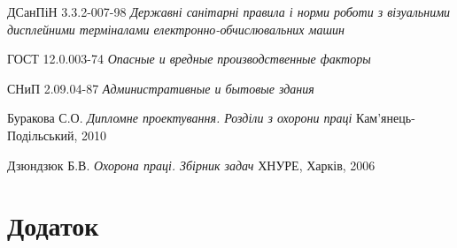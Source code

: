 \documentclass[a4paper,12pt]{article}
\begin{document}
\begin{thebibliography}{9}
	ДСанПіН  3.3.2-007-98
	\emph{Державні санітарні правила і норми роботи з візуальними дисплейними терміналами електронно-обчислювальних машин}
	
	ГОСТ 12.0.003-74
	\emph{Опасные и вредные производственные факторы}
	
	СНиП 2.09.04-87
	\emph{Административные и бытовые здания}
	
	Буракова С.О.
	\emph{Дипломне проектування. Розділи з охорони праці}
	Кам’янець-Подільський, 2010
	
	Дзюндзюк Б.В.
	\emph{Охорона праці. Збірник задач}
	ХНУРЕ, Харків, 2006

\end{thebibliography}

\newpage
{}
\section*{Додаток}


\lstset{
	basicstyle=\scriptsize,
	tabsize=2,
	breaklines=true,
	title=\lstname,
	showspaces=false,
	showstringspaces=false,
	showtabs=false
} 
















\end{document}
